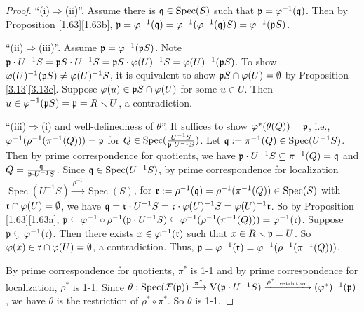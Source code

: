 \begin{proof}
    ``(i)$\Rightarrow$(ii)''. Assume there is $\mathfrak{q} \in \operatorname{Spec}(S)$ such that $\mathfrak{p} = \varphi^{-1}(\mathfrak{q})$. Then by Proposition \ref{1.63}\ref{1.63b}, $\mathfrak{p} = \varphi^{-1}(\mathfrak{q}) = \varphi^{-1}(\varphi^{-1}(\mathfrak{q})S) = \varphi^{-1}(\mathfrak{p} S)$. \par 
    ``(ii)$\Rightarrow$(iii)''. Assume $\mathfrak{p} = \varphi^{-1}(\mathfrak{p} S)$. Note $\mathfrak{p} \cdot U^{-1}S = \mathfrak{p} S \cdot U^{-1}S = \mathfrak{p} S \cdot \varphi(U)^{-1}S = \varphi(U)^{-1} (\mathfrak{p} S)$. To show $\varphi(U)^{-1}(\mathfrak{p} S) \neq \varphi(U)^{-1}S$, it is equivalent to show $\mathfrak{p} S \cap \varphi(U) = \emptyset$ by Proposition \ref{3.13}\ref{3.13c}. Suppose $\varphi(u) \in \mathfrak{p} S \cap \varphi(U)$ for some $u \in U$. Then $u \in \varphi^{-1}(\mathfrak{p} S) = \mathfrak{p} = R \smallsetminus U$, a contradiction. \par 
    ``(iii)$\Rightarrow$(i) and well-definedness of $\theta$''. It suffices to show $\varphi^{*}(\theta(Q)) = \mathfrak{p}$, i.e., $\varphi^{-1}(\rho^{-1}(\pi^{-1}(Q))) = \mathfrak{p}$ for $Q \in \operatorname{Spec}(\frac{U^{-1}S}{\mathfrak{p} \cdot U^{-1}S})$. Let $\mathfrak{q} := \pi^{-1}(Q) \in \operatorname{Spec}(U^{-1}S)$. Then by prime correspondence for quotients, we have $\mathfrak{p} \cdot U^{-1} S \subseteq \pi^{-1}(Q) = \mathfrak{q}$ and $Q = \frac{\mathfrak{q}}{\mathfrak{p} \cdot U^{-1}S}$. Since $\mathfrak{q} \in \operatorname{Spec}(U^{-1}S)$, by prime correspondence for localization $\operatorname{Spec}(U^{-1}S) \xrightarrow{\rho^{-1}} \operatorname{Spec}(S)$, for $\mathfrak{r} := \rho^{-1}(\mathfrak{q}) = \rho^{-1}(\pi^{-1}(Q)) \in \operatorname{Spec}(S)$ with $\mathfrak{r} \cap \varphi(U) = \emptyset$, we have $\mathfrak{q} = \mathfrak{r} \cdot U^{-1}S = \mathfrak{r} \cdot \varphi(U)^{-1}S = \varphi(U)^{-1}\mathfrak{r}$. So by Proposition \ref{1.63}\ref{1.63a}, $\mathfrak{p} \subseteq \varphi^{-1} \circ \rho^{-1}(\mathfrak{p} \cdot U^{-1}S) \subseteq \varphi^{-1}(\rho^{-1}(\pi^{-1}(Q))) = \varphi^{-1}(\mathfrak{r})$. Suppose $\mathfrak{p} \subsetneq \varphi^{-1}(\mathfrak{r})$. Then there exists $x \in \varphi^{-1}(\mathfrak{r})$ such that $x \in R \smallsetminus \mathfrak{p} = U$. So $\varphi(x) \in \mathfrak{r} \cap \varphi(U) = \emptyset$, a contradiction. Thus, $\mathfrak{p} = \varphi^{-1}(\mathfrak{r}) = \varphi^{-1}(\rho^{-1}(\pi^{-1}(Q)))$. \par 
    By prime correspondence for quotients, $\pi^{*}$ is 1-1 and by prime correspondence for localization, $\rho^{*}$ is 1-1. Since $\theta: \operatorname{Spec}(\mathcal{F}(\mathfrak{p})) \xrightarrow{\pi^{*}} \operatorname{V}(\mathfrak{p} \cdot U^{-1}S) \xrightarrow{\rho^{*}|_{\text{restriction}}} (\varphi^{*})^{-1}(\mathfrak{p})$, we have $\theta$ is the restriction of $\rho^{*} \circ \pi^{*}$. So $\theta$ is 1-1. \par 

\end{proof}
